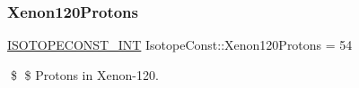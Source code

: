 \subsubsection{\texorpdfstring{Xenon120\+Protons}{Xenon120Protons}}
{\footnotesize\ttfamily \mbox{\hyperlink{group___isotope_const-_macros_ga5f18360b3e99483a35c32d789e62621c}{I\+S\+O\+T\+O\+P\+E\+C\+O\+N\+S\+T\+\_\+\+I\+NT}} Isotope\+Const\+::\+Xenon120\+Protons = 54}

\$ \$ Protons in Xenon-\/120. 